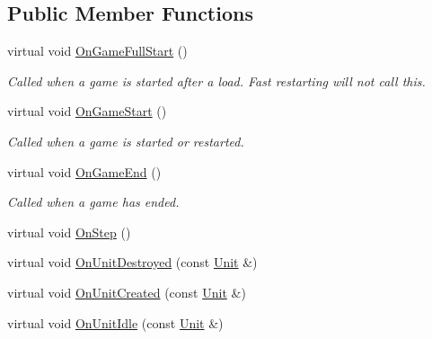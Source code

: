 \subsection*{Public Member Functions}
\begin{DoxyCompactItemize}
\item 
\mbox{\label{classsc2_1_1_client_events_ab980f6942030d3a0cd42e00782742237}} 
virtual void \hyperlink{classsc2_1_1_client_events_ab980f6942030d3a0cd42e00782742237}{On\+Game\+Full\+Start} ()
\begin{DoxyCompactList}\small\item\em Called when a game is started after a load. Fast restarting will not call this. \end{DoxyCompactList}\item 
\mbox{\label{classsc2_1_1_client_events_a6e2542b183f6ac980440cc93476163a3}} 
virtual void \hyperlink{classsc2_1_1_client_events_a6e2542b183f6ac980440cc93476163a3}{On\+Game\+Start} ()
\begin{DoxyCompactList}\small\item\em Called when a game is started or restarted. \end{DoxyCompactList}\item 
\mbox{\label{classsc2_1_1_client_events_a2c5023d18ffc88bed76c844e643ef60d}} 
virtual void \hyperlink{classsc2_1_1_client_events_a2c5023d18ffc88bed76c844e643ef60d}{On\+Game\+End} ()
\begin{DoxyCompactList}\small\item\em Called when a game has ended. \end{DoxyCompactList}\item 
virtual void \hyperlink{classsc2_1_1_client_events_a6f5839e220d2a5a19b30065e0b8290c4}{On\+Step} ()
\item 
virtual void \hyperlink{classsc2_1_1_client_events_a1e0c8a37df68695cf898aa86fddc5a1a}{On\+Unit\+Destroyed} (const \hyperlink{classsc2_1_1_unit}{Unit} \&)
\item 
virtual void \hyperlink{classsc2_1_1_client_events_a28c6dc5471d2a7bacfc6cf289983bcc5}{On\+Unit\+Created} (const \hyperlink{classsc2_1_1_unit}{Unit} \&)
\item 
virtual void \hyperlink{classsc2_1_1_client_events_ac1d79ab7cceb688172f375edb2f48f60}{On\+Unit\+Idle} (const \hyperlink{classsc2_1_1_unit}{Unit} \&)

\end{DoxyCompactItemize}
